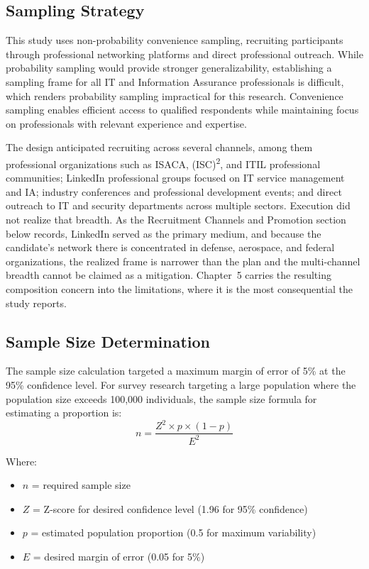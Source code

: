 \subsection{Sampling Strategy}

This study uses non-probability convenience sampling, recruiting participants through professional networking platforms and direct professional outreach. While probability sampling would provide stronger generalizability, establishing a sampling frame for all IT and Information Assurance professionals is difficult, which renders probability sampling impractical for this research. Convenience sampling enables efficient access to qualified respondents while maintaining focus on professionals with relevant experience and expertise.

The design anticipated recruiting across several channels, among them professional organizations such as ISACA, (ISC)\textsuperscript{2}, and ITIL professional communities; LinkedIn professional groups focused on IT service management and IA; industry conferences and professional development events; and direct outreach to IT and security departments across multiple sectors. Execution did not realize that breadth. As the Recruitment Channels and Promotion section below records, LinkedIn served as the primary medium, and because the candidate's network there is concentrated in defense, aerospace, and federal organizations, the realized frame is narrower than the plan and the multi-channel breadth cannot be claimed as a mitigation. Chapter~5 carries the resulting composition concern into the limitations, where it is the most consequential the study reports.

\subsection{Sample Size Determination}

The sample size calculation targeted a maximum margin of error of 5\% at the 95\% confidence level. For survey research targeting a large population where the population size exceeds 100,000 individuals, the sample size formula for estimating a proportion is:
\clearpage
\begin{equation}
  \label{eqn:modelSizeEquation}
  n = \frac{Z^2 \times p \times (1-p)}{E^2}
\end{equation}

Where:
\begin{itemize}
  \item \(n\) = required sample size
  \item \(Z\) = Z-score for desired confidence level (1.96 for 95\% confidence)
  \item \(p\) = estimated population proportion (0.5 for maximum variability)
  \item \(E\) = desired margin of error (0.05 for 5\%)
\end{itemize}

